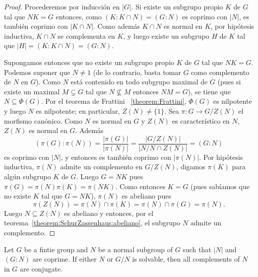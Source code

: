 \begin{proof}
	Procederemos por inducción en $|G|$. Si existe un subgrupo propio $K$ de
	$G$ tal que $NK=G$ entonces, como $(K:K\cap N)=(G:N)$ es coprimo con $|N|$,
	es también coprimo con $|K\cap N|$. Como además $K\cap N$ es normal en $K$,
	por hipótesis inductiva, $K\cap N$ se complementa en $K$, y luego existe un
	subgrupo $H$ de $K$ tal que $|H|=(K:K\cap N)=(G:N)$. 
	
	Supongamos entonces que no existe un subgrupo propio $K$ de $G$ tal que
	$NK=G$.  Podemos suponer que $N\ne1$ (de lo contrario, basta tomar $G$ como
	complemento de $N$ en $G$).  Como $N$ está contenido en todo subgrupo
	maximal de $G$ (pues si existe un maximal $M\subsetneq G$ tal que
	$N\not\subseteq M$ entonces $NM=G$), se tiene que $N\subseteq\Phi(G)$. Por
	el teorema de Frattini ~\ref{theorem:Frattini}, $\Phi(G)$ es nilpotente y
	luego $N$ es nilpotente; en particular, $Z(N)\ne\{1\}$. Sea $\pi\colon G\to
	G/Z(N)$ el morfismo canónico. Como $N$ es normal en $G$ y $Z(N)$ es
	característico en $N$, $Z(N)$ es normal en $G$.  Además 
	\[
	(\pi(G):\pi(N))=\frac{|\pi(G)|}{|\pi(N)|}=\frac{|G/Z(N)|}{|N/N\cap Z(N)|}=(G:N)
	\]
	es coprimo con $|N|$, y entonces es también coprimo con $|\pi(N)|$. Por hipótesis
	inductiva, $\pi(N)$ admite un complemento en $G/Z(N)$, digamos $\pi(K)$
	para algún subgrupo $K$ de $G$. Luego $G=NK$ pues 
	$\pi(G)=\pi(N)\pi(K)=\pi(NK)$. 
	Como entonces $K=G$ (pues sabíamos que no existe $K$ tal que $G=NK$), 
	$\pi(N)$ es abeliano pues 
	\[
		\pi(Z(N))=\pi(N)\cap\pi(K)=\pi(N)\cap\pi(G)=\pi(N).
	\]
	Luego $N\subseteq Z(N)$ es abeliano y entonces, por el
	teorema~\ref{theorem:SchurZassenhaus:abeliano}, el subgrupo $N$ admite un
	complemento. 
\end{proof}

\begin{theorem}
	\label{them:SchurZassenhaus:conjugacion}
	Let $G$ be a fintie group and $N$ be a normal subgroup of $G$ such that $|N|$ and 
	$(G:N)$ are coprime. If either $N$ or $G/N$ is solvable, then all complements of $N$ in $G$ 
	are conjugate. 
\end{theorem}

%
%
%

